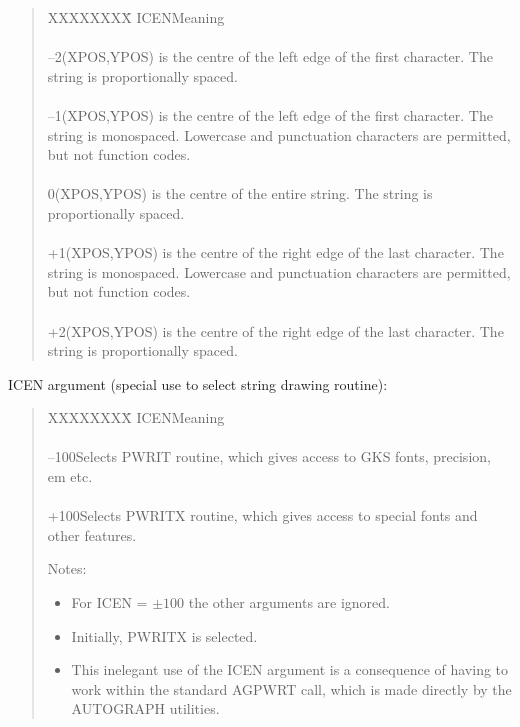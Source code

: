\documentclass[11pt]{article}
\renewcommand{\_}{{\tt\char'137}}     %
\begin{document}
\begin{quote}
\begin{tabbing}
XXXXXXXX\=\kill
ICEN\>Meaning\\
\\
--2\>(XPOS,YPOS) is the centre of the left edge of the first character.  The\\
\>string is proportionally spaced.\\
\\
--1\>(XPOS,YPOS) is the centre of the left edge of the first character.  The\\
\>string is monospaced.  Lowercase and punctuation characters are permitted,\\
\>but not function codes.\\
\\
0\>(XPOS,YPOS) is the centre of the entire string.  The string is\\
\>proportionally spaced.\\
\\
+1\>(XPOS,YPOS) is the centre of the right edge of the last character.  The\\
\>string is monospaced.  Lowercase and punctuation characters are permitted,\\
\>but not function codes.\\
\\
+2\>(XPOS,YPOS) is the centre of the right edge of the last character.  The\\
\>string is proportionally spaced.\\
\end{tabbing}
\end{quote}

ICEN argument (special use to select string drawing routine):

\begin{quote}
\begin{tabbing}
XXXXXXXX\=\kill
ICEN\>Meaning\\
\\
--100\>Selects PWRIT routine, which gives access to GKS fonts, precision, 
{em etc.}\\
\\
+100\>Selects PWRITX routine, which gives access to special fonts and other
features.
\end{tabbing}

Notes:

\begin{itemize}
\item For ICEN = $\pm100$ the other arguments are ignored.
\item Initially, PWRITX is selected.
\item This inelegant use of the ICEN argument is a consequence
of having to work within the standard AGPWRT call, which
is made directly by the AUTOGRAPH utilities.
\end{itemize}
\end{quote}
\end{document}
